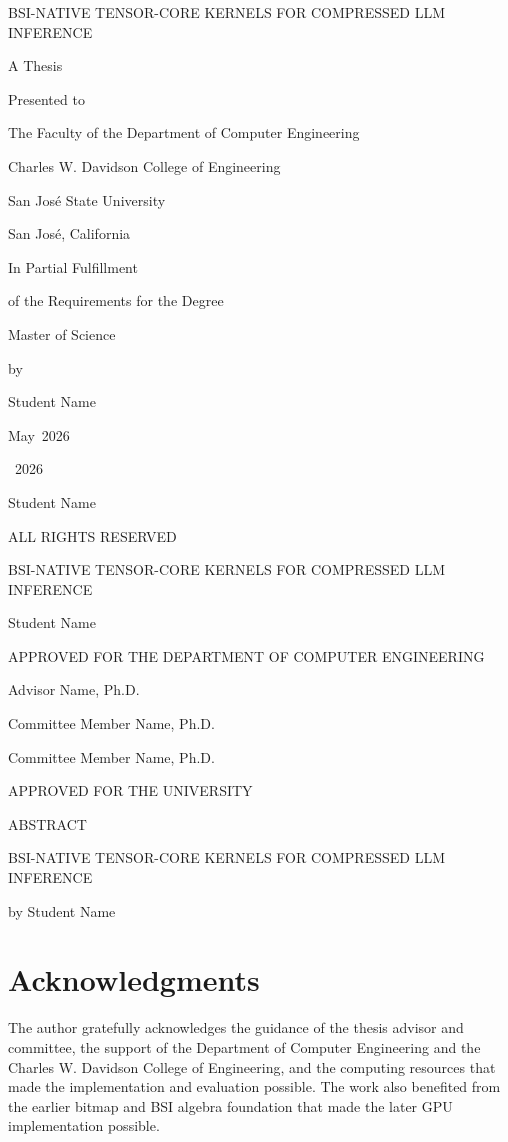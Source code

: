 \documentclass[12pt,oneside]{report}
\newcommand{\ThesisTitle}{BSI-Native Tensor-Core Kernels for Compressed LLM Inference}
\newcommand{\ThesisAuthor}{Student Name}
\newcommand{\DegreeName}{Master of Science}
\newcommand{\DepartmentName}{Department of Computer Engineering}
\newcommand{\CollegeName}{Charles W. Davidson College of Engineering}
\newcommand{\InstitutionName}{San Jos\'e State University}
\newcommand{\InstitutionLocation}{San Jos\'e, California}
\newcommand{\GraduationMonth}{May}
\newcommand{\GraduationYear}{2026}
\newcommand{\AdvisorName}{Advisor Name, Ph.D.}
\newcommand{\CommitteeBName}{Committee Member Name, Ph.D.}
\newcommand{\CommitteeCName}{Committee Member Name, Ph.D.}
\newcommand{\MakeSJSUTitlePage}{%
  \thispagestyle{empty}%
  \begin{center}
  {\MakeUppercase{\ThesisTitle}\par}
  \vfill
  A Thesis\par
  Presented to\par
  The Faculty of the \DepartmentName\par
  \CollegeName\par
  \InstitutionName\par
  \InstitutionLocation\par
  \vfill
  In Partial Fulfillment\par
  of the Requirements for the Degree\par
  \DegreeName\par
  \vfill
  by\par
  \ThesisAuthor\par
  \GraduationMonth\ \GraduationYear\par
  \end{center}
  \clearpage
}
\newcommand{\MakeSJSUCopyrightPage}{%
  \thispagestyle{empty}%
  \null\vfill
  \begin{center}
  \textcopyright\ \GraduationYear\par
  \ThesisAuthor\par
  ALL RIGHTS RESERVED
  \end{center}
  \vfill\null
  \clearpage
}
\newcommand{\MakeSJSUCommitteePage}{%
  \thispagestyle{empty}%
  \begin{center}
  \MakeUppercase{\ThesisTitle}\par
  \vspace{1.5in}
  \ThesisAuthor\par
  \vspace{1in}
  APPROVED FOR THE \MakeUppercase{\DepartmentName}\par
  \vspace{0.75in}
  \end{center}
  \noindent
  \AdvisorName\par
  \vspace{0.75in}
  \noindent
  \CommitteeBName\par
  \vspace{0.75in}
  \noindent
  \CommitteeCName\par
  \vfill
  \begin{center}
  APPROVED FOR THE UNIVERSITY
  \end{center}
  \clearpage
}
\newcommand{\MakeSJSUAbstractPage}{%
  \thispagestyle{empty}%
  \begin{center}
  \MakeUppercase{ABSTRACT}\par
  \vspace{0.5in}
  \MakeUppercase{\ThesisTitle}\par
  \vspace{0.25in}
  by \ThesisAuthor
  \end{center}
  \vspace{0.5in}
  
  \clearpage
}
\begin{document}
\MakeSJSUTitlePage
\MakeSJSUCopyrightPage
\MakeSJSUCommitteePage
\MakeSJSUAbstractPage

\setcounter{page}{5}

\chapter*{Acknowledgments}
The author gratefully acknowledges the guidance of the thesis advisor and committee, the support of the Department of Computer Engineering and the Charles W. Davidson College of Engineering, and the computing resources that made the implementation and evaluation possible. The work also benefited from the earlier bitmap and BSI algebra foundation that made the later GPU implementation possible.
\clearpage

\tableofcontents
\clearpage
\listoffigures
\clearpage
\listoftables
\clearpage













\appendix




\end{document}
